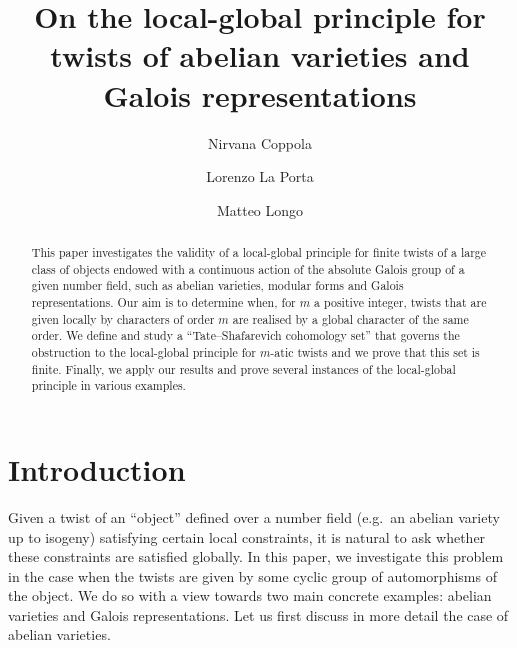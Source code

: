 \documentclass[a4paper,10pt]{amsart}
\title[Local-global principle for twists]{On the local-global principle for twists of abelian varieties and Galois representations}
\author{Nirvana Coppola}
\author{Lorenzo La Porta}
\author{Matteo Longo}
\theoremstyle{plain}
\theoremstyle{definition}
\theoremstyle{remark}
\begin{document}

\begin{abstract}
This paper investigates the validity of a local-global principle for finite twists of a large class of objects endowed with a continuous action of the absolute Galois group of a given number field, such as abelian varieties, modular forms and Galois representations. Our aim is to determine when, for $m$ a positive integer, twists that are given locally by characters of order $m$ are realised by a global character of the same order. We define and study a ``Tate--Shafarevich cohomology set'' that governs the obstruction to the local-global principle for $m$-atic twists and we prove that this set is finite. Finally, we apply our results and prove several instances of the local-global principle in various examples.
\end{abstract}

\maketitle

\tableofcontents

\section{Introduction}

Given a twist of an ``object'' defined over a number field (e.g.\ an abelian variety up to isogeny) satisfying certain local constraints, it is natural to ask whether these constraints are satisfied globally. In this paper, we investigate this problem in the case when the twists are given by some cyclic group of automorphisms of the object. We do so with a view towards two main concrete examples: abelian varieties and Galois representations. Let us first discuss in more detail the case of abelian varieties.
\end{document}
